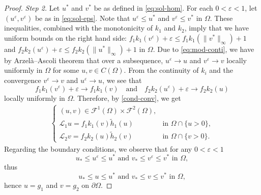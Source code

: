 \documentclass[11pt,oneside,english]{amsart}
\newcommand{\cL}{{\mathcal L}}
\newcommand{\cF}{{\mathcal F}}
\newcommand{\e}{\varepsilon}
\numberwithin{equation}{section}
\theoremstyle{plain}
\numberwithin{equation}{section}
\begin{document}
\begin{proof}
\medskip\noindent\emph{Step 2.} Let $u^*$ and $v^*$ be as defined in \eqref{eq:sol-hom}. For each $0<\e<1$, let $(u^\e,v^\e)$ be as in \eqref{eq:sol-eps}. Note that $u^\e\le u^*$ and $v^\e\le v^*$ in $\Omega$. These inequalities, combined with the monotonicity of $k_1$ and $k_2$, imply that we  have  uniform bounds on the right hand side: $f_1k_1(v^\e)+\e\le f_1k_1(\|v^*\|_\infty)+1$ and $f_2k_2(u^\e)+\e\le f_2k_2(\|u^*\|_\infty)+1$ in $\Omega$. Due to \eqref{eq:mod-conti}, we have by Arzelà–Ascoli theorem that over a subsequence, $u^\e\to u$ and $v^\e\to v$ locally uniformly in $\Omega$ for some $u,v\in C(\Omega)$.
From the continuity of $k_i$ and the convergence $v^\e \to v$ and $u^\e\to u$, we see that
\[
f_1 k_1(v^\e) + \e \to f_1 k_1(v)\quad\text{and}\quad f_2k_2(u^\e)+\e\to f_2k_2(u)
\]
locally uniformly in $\Omega$. 
Therefore, by \ref{cond-conv}, we get
\begin{align*}
    \begin{cases}
        (u,v)\in \cF^1(\Omega)\times \cF^2(\Omega),\\
        \cL_1u=f_1k_1(v)\tilde h_1(u)&\text{in }\Omega\cap\{u>0\},\\
        \cL_2v=f_2k_2(u)\tilde h_2(v)&\text{in }\Omega\cap\{v>0\}.
    \end{cases}
\end{align*}
Regarding the boundary conditions, we observe that for any $0<\e<1$
$$
\text{$u_*\le u^\e\le u^*$ and $v_*\le v^\e\le v^*$ in $\Omega$},
$$
thus
$$
\text{$u_*\le u\le u^*$ and $v_*\le v\le v^*$ in $\Omega$},
$$
hence $u=g_1$ and $v=g_2$ on $\partial\Omega$.
\end{proof}
\end{document}
